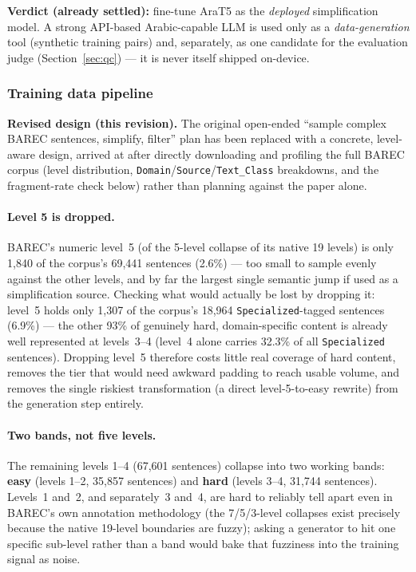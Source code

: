 \documentclass[11pt,a4paper]{article}
\begin{document}
\textbf{Verdict (already settled):} fine-tune AraT5 as the \emph{deployed}
simplification model. A strong API-based Arabic-capable LLM is used only as a
\emph{data-generation} tool (synthetic training pairs) and, separately, as one
candidate for the evaluation judge (Section~\ref{sec:qc}) --- it is never itself
shipped on-device.

\subsubsection{Training data pipeline}
\label{sec:datapipeline}

\begin{noteb}
\textbf{Revised design (this revision).} The original open-ended ``sample
complex BAREC sentences, simplify, filter'' plan has been replaced with a
concrete, level-aware design, arrived at after directly downloading and
profiling the full BAREC corpus (level distribution, \texttt{Domain}/\texttt{Source}/\texttt{Text\_Class}
breakdowns, and the fragment-rate check below) rather than planning against
the paper alone.
\end{noteb}

\paragraph{Level 5 is dropped.}
\label{sec:level5}
BAREC's numeric level~5 (of the 5-level collapse of its native 19 levels) is
only 1,840 of the corpus's 69,441 sentences (2.6\%) --- too small to sample
evenly against the other levels, and by far the largest single semantic jump
if used as a simplification source. Checking what would actually be lost by
dropping it: level~5 holds only 1,307 of the corpus's 18,964
\texttt{Specialized}-tagged sentences (6.9\%) --- the other 93\% of genuinely
hard, domain-specific content is already well represented at levels~3--4
(level~4 alone carries 32.3\% of all \texttt{Specialized} sentences). Dropping
level~5 therefore costs little real coverage of hard content, removes the
tier that would need awkward padding to reach usable volume, and removes the
single riskiest transformation (a direct level-5-to-easy rewrite) from the
generation step entirely.

\paragraph{Two bands, not five levels.} The remaining levels 1--4 (67,601
sentences) collapse into two working bands: \textbf{easy} (levels 1--2,
35,857 sentences) and \textbf{hard} (levels 3--4, 31,744 sentences). Levels~1
and~2, and separately~3 and~4, are hard to reliably tell apart even in BAREC's
own annotation methodology (the 7/5/3-level collapses exist precisely because
the native 19-level boundaries are fuzzy); asking a generator to hit one
specific sub-level rather than a band would bake that fuzziness into the
training signal as noise.
\end{document}
